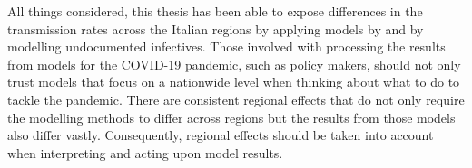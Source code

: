 \documentclass[12pt]{article}
\begin{document}
	 All things considered, this thesis has been able to expose differences in the transmission rates across the Italian regions by applying models by \textcite{adda2016economic} and by modelling undocumented infectives. Those involved with processing the results from models for the COVID-19 pandemic, such as policy makers, should not only trust models that focus on a nationwide level when thinking about what to do to tackle the pandemic. There are consistent regional effects that do not only require the modelling methods to differ across regions but the results from those models also differ vastly. Consequently, regional effects should be taken into account when interpreting and acting upon model results.
	
	
	
\end{document}
